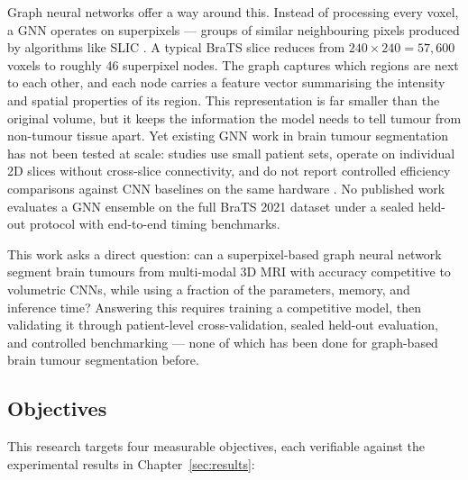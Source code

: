 \documentclass{article}
\begin{document}
Graph neural networks offer a way around this. Instead of processing every voxel,
a GNN operates on superpixels --- groups of similar neighbouring pixels produced
by algorithms like SLIC \cite{achanta2012slic}. A typical BraTS slice reduces
from $240 \times 240 = 57{,}600$ voxels to roughly 46 superpixel nodes. The graph
captures which regions are next to each other, and each node carries a feature
vector summarising the intensity and spatial properties of its region. This
representation is far smaller than the original volume, but it keeps the
information the model needs to tell tumour from non-tumour tissue apart. Yet
existing GNN work in brain tumour segmentation has not been tested at scale:
studies use small patient sets, operate on individual 2D slices without
cross-slice connectivity, and do not report controlled efficiency comparisons
against CNN baselines on the same hardware \cite{kipf2017gcn, hamilton2017graphsage}.
No published work evaluates a GNN ensemble on the full BraTS 2021 dataset under a
sealed held-out protocol with end-to-end timing benchmarks.

This work asks a direct question: can a superpixel-based graph neural network
segment brain tumours from multi-modal 3D MRI with accuracy competitive to
volumetric CNNs, while using a fraction of the parameters, memory, and inference
time? Answering this requires training a competitive model, then validating it
through patient-level cross-validation, sealed held-out evaluation, and controlled
benchmarking --- none of which has been done for graph-based brain tumour
segmentation before.

\subsection{Objectives}
\label{sec:objectives}

This research targets four measurable objectives, each verifiable against
the experimental results in Chapter~\ref{sec:results}:
\end{document}
